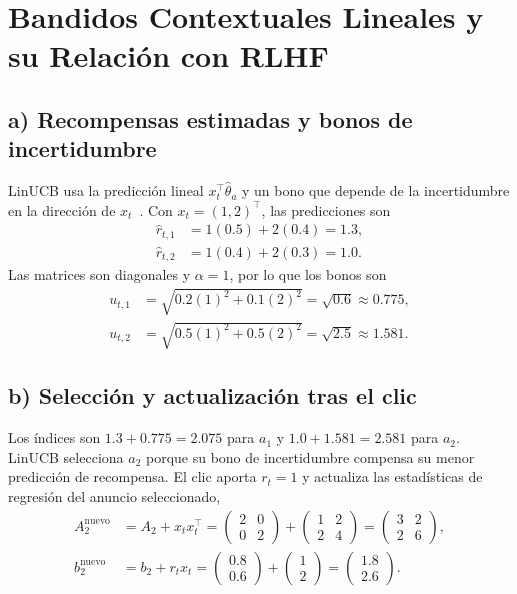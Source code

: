 \section{Bandidos Contextuales Lineales y su Relación con RLHF}

\subsection*{a) Recompensas estimadas y bonos de incertidumbre}

LinUCB usa la predicción lineal $x_t^\top\hat\theta_a$ y un bono que
depende de la incertidumbre en la dirección de
$x_t$~\cite{li2010}. Con $x_t=(1,2)^\top$, las predicciones son
\begin{align*}
    \hat r_{t,1}&=1(0.5)+2(0.4)=1.3,\\
    \hat r_{t,2}&=1(0.4)+2(0.3)=1.0.
\end{align*}
Las matrices son diagonales y $\alpha=1$, por lo que los bonos son
\begin{align*}
    u_{t,1}&=\sqrt{0.2(1)^2+0.1(2)^2}
      =\sqrt{0.6}\approx 0.775,\\
    u_{t,2}&=\sqrt{0.5(1)^2+0.5(2)^2}
      =\sqrt{2.5}\approx 1.581.
\end{align*}

\subsection*{b) Selección y actualización tras el clic}

Los índices son $1.3+0.775=2.075$ para $a_1$ y
$1.0+1.581=2.581$ para $a_2$. LinUCB selecciona $a_2$ porque su
bono de incertidumbre compensa su menor predicción de recompensa.
El clic aporta $r_t=1$ y actualiza las estadísticas de regresión
del anuncio seleccionado,
\begin{align*}
    A_2^{\mathrm{nuevo}}
    &=A_2+x_tx_t^\top
      =\begin{pmatrix}2&0\\0&2\end{pmatrix}
       +\begin{pmatrix}1&2\\2&4\end{pmatrix}
      =\begin{pmatrix}3&2\\2&6\end{pmatrix},\\
    b_2^{\mathrm{nuevo}}
    &=b_2+r_tx_t
      =\begin{pmatrix}0.8\\0.6\end{pmatrix}
       +\begin{pmatrix}1\\2\end{pmatrix}
      =\begin{pmatrix}1.8\\2.6\end{pmatrix}.
\end{align*}

